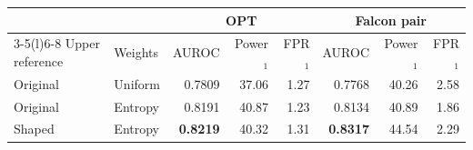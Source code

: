 \begin{tabular}{@{}llrrrrrr@{}}
\toprule
 & & \multicolumn{3}{c}{OPT} & \multicolumn{3}{c}{Falcon pair} \\
\cmidrule(lr){3-5}\cmidrule(l){6-8}
Upper reference & Weights & AUROC & Power$_1$ & FPR$_1$ & AUROC & Power$_1$ & FPR$_1$ \\
\midrule
Original & Uniform & 0.7809 & 37.06 & 1.27 & 0.7768 & 40.26 & 2.58 \\
Original & Entropy & 0.8191 & 40.87 & 1.23 & 0.8134 & 40.89 & 1.86 \\
Shaped & Entropy & \textbf{0.8219} & 40.32 & 1.31 & \textbf{0.8317} & 44.54 & 2.29 \\
\bottomrule
\end{tabular}
